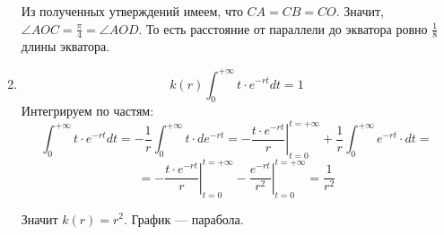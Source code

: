 \documentclass[11pt, a4paper]{article}
\begin{document}
\begin{enumerate}
\begin{center}
\end{center}

Из полученных утверждений имеем, что $CA = CB = CO$. Значит, $\angle AOC = \frac{\pi}{4} = \angle AOD$. То есть расстояние от параллели до экватора ровно $\frac18$ длины экватора.

\item 
$$ k(r) \int_{0}^{+\infty} t \cdot e^{-rt} dt = 1$$
Интегрируем по частям:
$$
\int_{0}^{+\infty} t \cdot e^{-rt} dt = 
- \frac{1}{r} \int_{0}^{+\infty} t \cdot d e^{-rt}  = 
- \left. \frac{t \cdot e^{-rt} }{r} \right|_{t=0}^{t=+\infty} + \frac{1}{r} \int_{0}^{+\infty} e^{-rt} \cdot dt   = 
$$
$$
= - \left. \frac{t \cdot e^{-rt} }{r} \right|_{t=0}^{t=+\infty} - \left. \frac{e^{-rt} }{r^2} \right|_{t=0}^{t=+\infty} = \frac{1}{r^2}
$$

Значит $k(r) = r^2$. График --- парабола.

\end{enumerate}
\end{document}

